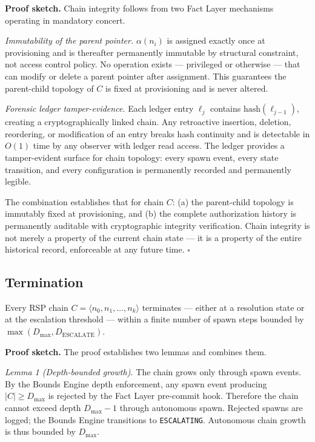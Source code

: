 \medskip\noindent\textbf{Proof sketch.}  Chain integrity follows from two Fact
Layer mechanisms operating in mandatory concert.

\medskip\noindent\textit{Immutability of the parent pointer.}  $\alpha(n_i)$
is assigned exactly once at provisioning and is thereafter permanently immutable
by structural constraint, not access control policy.  No operation exists ---
privileged or otherwise --- that can modify or delete a parent pointer after
assignment.  This guarantees the parent-child topology of $C$ is fixed at
provisioning and is never altered.

\medskip\noindent\textit{Forensic ledger tamper-evidence.}  Each ledger entry
$\ell_j$ contains $\text{hash}(\ell_{j-1})$, creating a cryptographically
linked chain.  Any retroactive insertion, deletion, reordering, or modification
of an entry breaks hash continuity and is detectable in $O(1)$ time by any
observer with ledger read access.  The ledger provides a tamper-evident surface
for chain topology: every spawn event, every state transition, and every
configuration is permanently recorded and permanently legible.

The combination establishes that for chain $C$: (a) the parent-child topology
is immutably fixed at provisioning, and (b) the complete authorization history
is permanently auditable with cryptographic integrity verification.  Chain
integrity is not merely a property of the current chain state --- it is a
property of the entire historical record, enforceable at any future time.
$\square$

\subsection{Termination}
\label{sec:rs-termination}

\begin{thrm}[Termination]
\label{thrm:termination}
Every RSP chain $C = \langle n_0, n_1, \ldots, n_k \rangle$ terminates ---
either at a resolution state or at the escalation threshold --- within a finite
number of spawn steps bounded by $\max(D_{\max}, D_{\mathrm{ESCALATE}})$.
\end{thrm}

\medskip\noindent\textbf{Proof sketch.}  The proof establishes two lemmas and
combines them.

\medskip\noindent\textit{Lemma 1 (Depth-bounded growth).}  The chain grows
only through spawn events.  By the Bounds Engine depth enforcement, any spawn
event producing $|C| \geq D_{\max}$ is rejected by the Fact Layer pre-commit hook.
Therefore the chain cannot exceed depth $D_{\max} - 1$ through autonomous spawn.
Rejected spawns are logged; the Bounds Engine transitions to \texttt{ESCALATING}.
Autonomous chain growth is thus bounded by $D_{\max}$.


